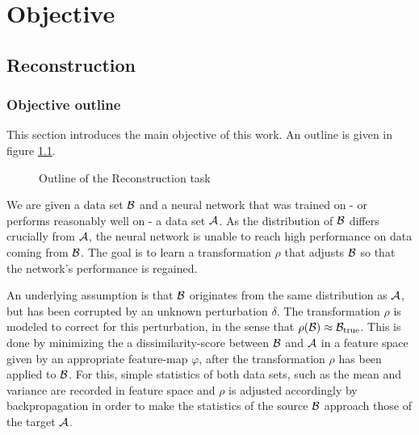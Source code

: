 \chapter{Objective}
\label{chap:Objective}





\section{Reconstruction}
\label{sec:Reconstruction}

\subsection{Objective outline}
This section introduces the main objective of this work. An outline is given in figure \ref{fig:outline}.
\begin{figure}[h]
    \centering
    
    \caption{Outline of the Reconstruction task}
    \label{fig:outline}
    \centering
\end{figure}


We are given a data set $\mathcal B$ 
and a neural network that was trained on - or performs reasonably well on - a data set $\mathcal A$.
As the distribution of $\mathcal B$ differs crucially from $\mathcal A$, 
the neural network is unable to reach high performance on data coming from $\mathcal B$.
The goal is to learn a transformation $\rho$ that adjusts $\mathcal B$ 
so that the network's performance is regained.

An underlying assumption is that $\mathcal B$ originates from the same distribution
as $\mathcal A$, but has been corrupted by an unknown perturbation $\delta$.
The transformation $\rho$ is modeled to correct for this perturbation, 
in the sense that $\rho(\mathcal B) \approx \mathcal B_\text{true}$.
This is done by minimizing the a dissimilarity-score between $\mathcal B$ and $\mathcal A$ 
in a feature space given by an appropriate feature-map $\varphi$, 
after the transformation $\rho$ has been applied to $\mathcal B$.
For this, simple statistics of both data sets, such as the mean and variance 
are recorded in feature space and $\rho$ is adjusted accordingly by backpropagation 
in order to make the statistics of the source $\mathcal B$ approach those of the target $\mathcal A$.

